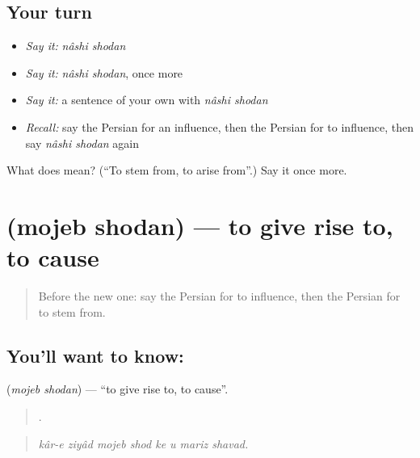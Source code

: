 \subsection*{Your turn}
\begin{itemize}
\raggedright
  \item \emph{Say it:} \emph{nâshi shodan}
  \item \emph{Say it:} \emph{nâshi shodan}, once more
  \item \emph{Say it:} a sentence of your own with \emph{nâshi shodan}
  \item \emph{Recall:} say the Persian for an influence, then the Persian for to influence, then say \emph{nâshi shodan} again
\end{itemize}

\begin{tcolorbox}[breakable,colback=teal!4,colframe=teal!35!black,title={Before you move on}]
What does   mean? (\textquotedblleft{}To stem from, to arise from\textquotedblright{}.) Say it once more.
\end{tcolorbox}
\section[\texorpdfstring{\fa{موجب} \fa{شدن} (mojeb shodan)}{موجب شدن (mojeb shodan)}]{  (mojeb shodan) — to give rise to, to cause}

\label{lesson:FA-C372-mojeb-shodan}



\begin{quote}
Before the new one: say the Persian for to influence, then the Persian for to stem from.
\end{quote}

\subsection*{You'll want to know:  }
\textbf{ } (\emph{mojeb shodan}) — \textquotedblleft{}to give rise to, to cause\textquotedblright{}.

\begin{quote}
       .
\end{quote}

\begin{quote}
\emph{kâr-e ziyâd mojeb shod ke u mariz shavad.}
\end{quote}


